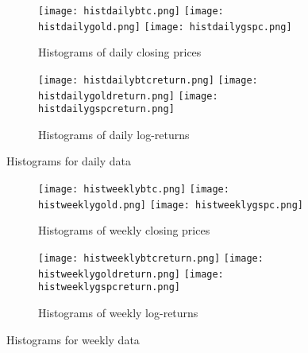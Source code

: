 \documentclass[12pt]{article}
\begin{document}
\begin{figure}[H]
\centering

\begin{subfigure}[b]{\textwidth}
\texttt{[image: histdailybtc.png]}\hfill
\texttt{[image: histdailygold.png]}\hfill
\texttt{[image: histdailygspc.png]}\hfill

\caption{ Histograms of daily closing prices}

\end{subfigure}

\begin{subfigure}[b]{\textwidth}
\texttt{[image: histdailybtcreturn.png]}\hfill
\texttt{[image: histdailygoldreturn.png]}\hfill
\texttt{[image: histdailygspcreturn.png]}\hfill

\caption{\label{histdailyreturn} Histograms of daily log-returns}

\end{subfigure}

\caption{\label{histdaily} Histograms for daily data}

\end{figure}




\begin{figure}[H]
\centering
\begin{subfigure}[b]{\textwidth}

\texttt{[image: histweeklybtc.png]}\hfill
\texttt{[image: histweeklygold.png]}\hfill
\texttt{[image: histweeklygspc.png]}\hfill
\caption{Histograms of weekly closing prices}
\label{histweekly}
\end{subfigure}
\begin{subfigure}[b]{\textwidth}
\texttt{[image: histweeklybtcreturn.png]}\hfill
\texttt{[image: histweeklygoldreturn.png]}\hfill
\texttt{[image: histweeklygspcreturn.png]}\hfill
\caption{Histograms of weekly log-returns}
\label{histweeklyreturn}
\end{subfigure}
\caption{\label{histweekly} Histograms for weekly data}

\end{figure}
\end{document}
